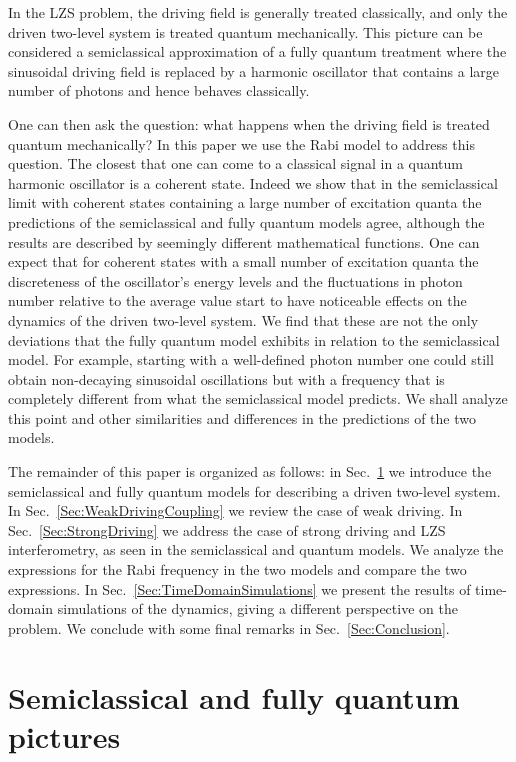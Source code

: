 \documentclass[aps,twocolumn,superscriptaddress]{revtex4}
\begin{document}
In the LZS problem, the driving field is generally treated classically, and only the driven two-level system is treated quantum mechanically. This picture can be considered a semiclassical approximation of a fully quantum treatment where the sinusoidal driving field is replaced by a harmonic oscillator that contains a large number of photons and hence behaves classically.

One can then ask the question: what happens when the driving field is treated quantum mechanically? In this paper we use the Rabi model to address this question. The closest that one can come to a classical signal in a quantum harmonic oscillator is a coherent state. Indeed we show that in the semiclassical limit with coherent states containing a large number of excitation quanta the predictions of the semiclassical and fully quantum models agree, although the results are described by seemingly different mathematical functions. One can expect that for coherent states with a small number of excitation quanta the discreteness of the oscillator's energy levels and the fluctuations in photon number relative to the average value start to have noticeable effects on the dynamics of the driven two-level system. We find that these are not the only deviations that the fully quantum model exhibits in relation to the semiclassical model. For example, starting with a well-defined photon number one could still obtain non-decaying sinusoidal oscillations but with a frequency that is completely different from what the semiclassical model predicts. We shall analyze this point and other similarities and differences in the predictions of the two models.

The remainder of this paper is organized as follows: in Sec.~\ref{Sec:SemiclassicalAndQuantumPictures} we introduce the semiclassical and fully quantum models for describing a driven two-level system. In Sec.~\ref{Sec:WeakDrivingCoupling} we review the case of weak driving. In Sec.~\ref{Sec:StrongDriving} we address the case of strong driving and LZS interferometry, as seen in the semiclassical and quantum models. We analyze the expressions for the Rabi frequency in the two models and compare the two expressions. In Sec.~\ref{Sec:TimeDomainSimulations} we present the results of time-domain simulations of the dynamics, giving a different perspective on the problem. We conclude with some final remarks in Sec.~\ref{Sec:Conclusion}.



\section{Semiclassical and fully quantum pictures}
\label{Sec:SemiclassicalAndQuantumPictures}
\end{document}
